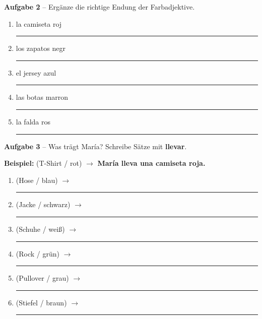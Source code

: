 \documentclass[11pt, a4paper]{article}
\newcommand{\fachfarbe}{spanisch}
\newcommand{\punktebox}[1]{\hfill\fbox{\small \_/#1}}
\newcommand{\luecke}[1]{\rule{#1}{0.4pt}}
\newcommand{\es}[1]{\textcolor{\fachfarbe}{\textbf{#1}}}
\begin{document}
\vspace{8pt}


\textbf{\textcolor{\fachfarbe}{Aufgabe 2}} -- Ergänze die richtige Endung der Farbadjektive. \punktebox{5}

\vspace{3pt}

\begin{enumerate}[label=\alph*), nosep, itemsep=4pt]
    \item la camiseta roj\luecke{1cm}
    \item los zapatos negr\luecke{1cm}
    \item el jersey azul\luecke{1cm}
    \item las botas marron\luecke{1cm}
    \item la falda ros\luecke{1cm}
\end{enumerate}

\vspace{8pt}


\textbf{\textcolor{\fachfarbe}{Aufgabe 3}} -- Was trägt María? Schreibe Sätze mit \es{llevar}. \punktebox{6}

\vspace{3pt}

\begin{hinweis}
\small \textbf{Beispiel:} (T-Shirt / rot) $\rightarrow$ \es{María lleva una camiseta roja.}
\end{hinweis}

\vspace{3pt}

\begin{enumerate}[label=\alph*), nosep, itemsep=4pt]
    \item (Hose / blau) $\rightarrow$ \luecke{8cm}
    \item (Jacke / schwarz) $\rightarrow$ \luecke{8cm}
    \item (Schuhe / weiß) $\rightarrow$ \luecke{8cm}
    \item (Rock / grün) $\rightarrow$ \luecke{8cm}
    \item (Pullover / grau) $\rightarrow$ \luecke{8cm}
    \item (Stiefel / braun) $\rightarrow$ \luecke{8cm}
\end{enumerate}
\end{document}
